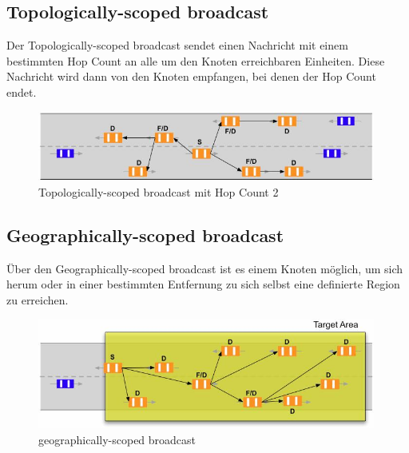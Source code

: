 \subsection{Topologically-scoped broadcast}
Der Topologically-scoped broadcast sendet einen Nachricht mit einem bestimmten Hop Count an alle um den Knoten erreichbaren Einheiten. Diese Nachricht wird dann von den Knoten empfangen, bei denen der Hop Count endet.

\begin{figure}
\includegraphics[width=0.99\textwidth]{content/images/03_networklayer/TSC.jpg}
\caption{Topologically-scoped broadcast mit Hop Count 2 \cite{etsi102636-1}}
\label{fig:tsc}
\end{figure}


\subsection{Geographically-scoped broadcast}
Über den Geographically-scoped broadcast ist es einem Knoten möglich, um sich herum oder in einer bestimmten Entfernung zu sich selbst eine definierte Region zu erreichen. 

\begin{figure}
\includegraphics[width=0.99\textwidth]{content/images/03_networklayer/GSB.jpg}
\caption{geographically-scoped broadcast \cite{etsi102636-1}}
\label{fig:gsb}
\end{figure}
